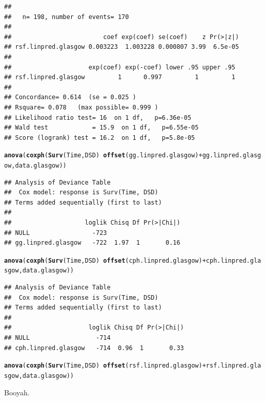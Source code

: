 \documentclass{article}\usepackage[]{graphicx}\usepackage[]{color}
\makeatletter
\newcommand{\hlopt}[1]{\textcolor[rgb]{0,0,0}{#1}}%
\newcommand{\hlstd}[1]{\textcolor[rgb]{0.345,0.345,0.345}{#1}}%
\newcommand{\hlkwd}[1]{\textcolor[rgb]{0.737,0.353,0.396}{\textbf{#1}}}%
\newenvironment{kframe}{%
 \def\at@end@of@kframe{}%
 \ifinner\ifhmode%
  \def\at@end@of@kframe{\end{minipage}}%
  \begin{minipage}{\columnwidth}%
 \fi\fi%
 \def\FrameCommand##1{\hskip\@totalleftmargin \hskip-\fboxsep
 \colorbox{shadecolor}{##1}\hskip-\fboxsep
     \hskip-\linewidth \hskip-\@totalleftmargin \hskip\columnwidth}%
 \MakeFramed {\advance\hsize-\width
   \@totalleftmargin\z@ \linewidth\hsize
   \@setminipage}}%
 {\par\unskip\endMakeFramed%
 \at@end@of@kframe}
\newenvironment{knitrout}{}{} %
\makeatother
\begin{document}
\begin{knitrout}
\begin{kframe}
\begin{verbatim}
## 
##   n= 198, number of events= 170 
## 
##                         coef exp(coef) se(coef)    z Pr(>|z|)
## rsf.linpred.glasgow 0.003223  1.003228 0.000807 3.99  6.5e-05
## 
##                     exp(coef) exp(-coef) lower .95 upper .95
## rsf.linpred.glasgow         1      0.997         1         1
## 
## Concordance= 0.614  (se = 0.025 )
## Rsquare= 0.078   (max possible= 0.999 )
## Likelihood ratio test= 16  on 1 df,   p=6.36e-05
## Wald test            = 15.9  on 1 df,   p=6.55e-05
## Score (logrank) test = 16.2  on 1 df,   p=5.8e-05
\end{verbatim}
\begin{alltt}
\hlkwd{anova}\hlstd{(}\hlkwd{coxph}\hlstd{(}\hlkwd{Surv}\hlstd{(Time, DSD)} \hlopt{~} \hlkwd{offset}\hlstd{(gg.linpred.glasgow)} \hlopt{+} \hlstd{gg.linpred.glasgow, data.glasgow))}
\end{alltt}
\begin{verbatim}
## Analysis of Deviance Table
##  Cox model: response is Surv(Time, DSD)
## Terms added sequentially (first to last)
## 
##                    loglik Chisq Df Pr(>|Chi|)
## NULL                 -723                    
## gg.linpred.glasgow   -722  1.97  1       0.16
\end{verbatim}
\begin{alltt}
\hlkwd{anova}\hlstd{(}\hlkwd{coxph}\hlstd{(}\hlkwd{Surv}\hlstd{(Time, DSD)} \hlopt{~} \hlkwd{offset}\hlstd{(cph.linpred.glasgow)} \hlopt{+} \hlstd{cph.linpred.glasgow, data.glasgow))}
\end{alltt}
\begin{verbatim}
## Analysis of Deviance Table
##  Cox model: response is Surv(Time, DSD)
## Terms added sequentially (first to last)
## 
##                     loglik Chisq Df Pr(>|Chi|)
## NULL                  -714                    
## cph.linpred.glasgow   -714  0.96  1       0.33
\end{verbatim}
\begin{alltt}
\hlkwd{anova}\hlstd{(}\hlkwd{coxph}\hlstd{(}\hlkwd{Surv}\hlstd{(Time, DSD)} \hlopt{~} \hlkwd{offset}\hlstd{(rsf.linpred.glasgow)} \hlopt{+} \hlstd{rsf.linpred.glasgow, data.glasgow))}
\end{alltt}


{\ttfamily\noindent\color{warningcolor}{\#\# Warning in fitter(X, Y, strats, offset, init, control, weights = weights, : Ran out of iterations and did not converge}}

{\ttfamily\noindent\bfseries\color{errorcolor}{\#\# Error in fitter(X, Y, strats, offset, init, control, weights = weights, : NA/NaN/Inf in foreign function call (arg 6)}}\end{kframe}
\end{knitrout}
Booyah.
\end{document}
